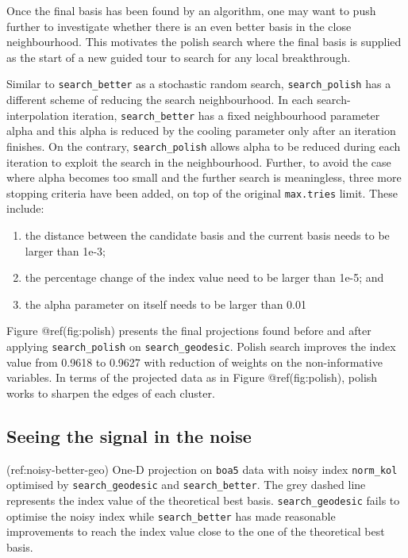 Once the final basis has been found by an algorithm, one may want to push further to investigate whether there is an even better basis in the close neighbourhood. This motivates the polish search where the final basis is supplied as the start of a new guided tour to search for any local breakthrough.

Similar to \texttt{search\_better} as a stochastic random search, \texttt{search\_polish} has a different scheme of reducing the search neighbourhood. In each search-interpolation iteration, \texttt{search\_better} has a fixed neighbourhood parameter alpha and this alpha is reduced by the cooling parameter only after an iteration finishes. On the contrary, \texttt{search\_polish} allows alpha to be reduced during each iteration to exploit the search in the neighbourhood. Further, to avoid the case where alpha becomes too small and the further search is meaningless, three more stopping criteria have been added, on top of the original \texttt{max.tries} limit. These include:

\begin{enumerate}
\def\labelenumi{\arabic{enumi})}
\tightlist
\item
  the distance between the candidate basis and the current basis needs to be larger than 1e-3;
\item
  the percentage change of the index value need to be larger than 1e-5; and
\item
  the alpha parameter on itself needs to be larger than 0.01
\end{enumerate}

Figure @ref(fig:polish) presents the final projections found before and after applying \texttt{search\_polish} on \texttt{search\_geodesic}. Polish search improves the index value from 0.9618 to 0.9627 with reduction of weights on the non-informative variables. In terms of the projected data as in Figure @ref(fig:polish), polish works to sharpen the edges of each cluster.

\hypertarget{seeing-the-signal-in-the-noise}{%
\subsection{Seeing the signal in the noise}\label{seeing-the-signal-in-the-noise}}

(ref:noisy-better-geo) One-D projection on \texttt{boa5} data with noisy index \texttt{norm\_kol} optimised by \texttt{search\_geodesic} and \texttt{search\_better}. The grey dashed line represents the index value of the theoretical best basis. \texttt{search\_geodesic} fails to optimise the noisy index while \texttt{search\_better} has made reasonable improvements to reach the index value close to the one of the theoretical best basis.

